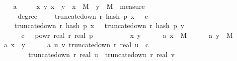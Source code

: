\begin{isabellebody}
\isanewline
\ \ \isamarkupfalse%
\ a{}{\isacharcolon}{\kern0pt}\ \isanewline
\ \ \ \ {\isachardoublequoteopen}{\isasymAnd}x\ y{\isachardot}{\kern0pt}\ x\ {\isacharless}{\kern0pt}\ y\ {\isasymLongrightarrow}\ x\ {\isasymin}\ M\ {\isasymLongrightarrow}\ y\ {\isasymin}\ M\ {\isasymLongrightarrow}\ measure\ {\isasymOmega}\ \isanewline
\ \ \ \ {\isacharbraceleft}{\kern0pt}{\isasymomega}{\isachardot}{\kern0pt}\ degree\ {\isasymomega}\ {\isasymge}\ {}\ {\isasymand}\ truncate{\isacharunderscore}{\kern0pt}down\ r\ {\isacharparenleft}{\kern0pt}hash\ p\ x\ {\isasymomega}{\isacharparenright}{\kern0pt}\ {\isasymle}\ c\ {\isasymand}\isanewline
\ \ \ \ truncate{\isacharunderscore}{\kern0pt}down\ r\ {\isacharparenleft}{\kern0pt}hash\ p\ x\ {\isasymomega}{\isacharparenright}{\kern0pt}\ {\isacharequal}{\kern0pt}\ truncate{\isacharunderscore}{\kern0pt}down\ r\ {\isacharparenleft}{\kern0pt}hash\ p\ y\ {\isasymomega}{\isacharparenright}{\kern0pt}{\isacharbraceright}{\kern0pt}\ {\isasymle}\ \isanewline
\ \ \ \ {}{}\ {\isacharasterisk}{\kern0pt}\ c\ {\isacharasterisk}{\kern0pt}\ {}\ powr\ {\isacharparenleft}{\kern0pt}{\isacharminus}{\kern0pt}real\ r{\isacharparenright}{\kern0pt}\ {\isacharslash}{\kern0pt}{\isacharparenleft}{\kern0pt}real\ p{\isacharparenright}{\kern0pt}\isanewline
\ \ \isamarkupfalse%
\ {\isacharminus}{\kern0pt}\isanewline
\ \ \ \ \isamarkupfalse%
\ x\ y\isanewline
\ \ \ \ \isamarkupfalse%
\ a{}{\isacharunderscore}{\kern0pt}{}{\isacharcolon}{\kern0pt}\ {\isachardoublequoteopen}x\ {\isasymin}\ M{\isachardoublequoteclose}\isanewline
\ \ \ \ \isamarkupfalse%
\ a{}{\isacharunderscore}{\kern0pt}{}{\isacharcolon}{\kern0pt}\ {\isachardoublequoteopen}y\ {\isasymin}\ M{\isachardoublequoteclose}\isanewline
\ \ \ \ \isamarkupfalse%
\ a{}{\isacharunderscore}{\kern0pt}{}{\isacharcolon}{\kern0pt}\ {\isachardoublequoteopen}x\ {\isacharless}{\kern0pt}\ y{\isachardoublequoteclose}\isanewline
\isanewline
\ \ \ \ \isamarkupfalse%
\ a{}{\isacharunderscore}{\kern0pt}{}{\isacharcolon}{\kern0pt}\ {\isachardoublequoteopen}{\isasymAnd}u\ v{\isachardot}{\kern0pt}\ truncate{\isacharunderscore}{\kern0pt}down\ r\ {\isacharparenleft}{\kern0pt}real\ u{\isacharparenright}{\kern0pt}\ {\isasymle}\ c\ {\isasymLongrightarrow}\ \isanewline
\ \ \ \ \ \ \ \ truncate{\isacharunderscore}{\kern0pt}down\ r\ {\isacharparenleft}{\kern0pt}real\ u{\isacharparenright}{\kern0pt}\ {\isacharequal}{\kern0pt}\ truncate{\isacharunderscore}{\kern0pt}down\ r\ {\isacharparenleft}{\kern0pt}real\ v{\isacharparenright}{\kern0pt}\ {\isasymLongrightarrow}\isanewline

\end{isabellebody}
